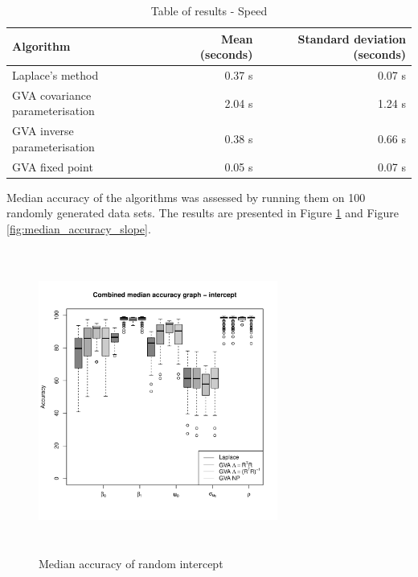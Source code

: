 			\begin{table}
				\caption{Table of results - Speed}
				\label{tab:application_slope_speed}
				\begin{tabular}{|l|rr|}
					\hline
					Algorithm                            & Mean (seconds) & Standard deviation (seconds) \\
					\hline
					Laplace's method                     & 0.37 s         & 0.07 s                       \\
					GVA covariance parameterisation        & 2.04 s         & 1.24 s                       \\
					GVA inverse parameterisation & 0.38 s         & 0.66 s                       \\
					GVA fixed point                            & 0.05 s         & 0.07 s                       \\
					\hline
				\end{tabular}
			\end{table}

					
			Median accuracy of the algorithms was assessed by running them on 100 randomly generated data sets. The	results are presented in Figure \ref{fig:median_accuracy_intercept} and Figure
			\ref{fig:median_accuracy_slope}.
					
			\begin{figure}
				\begin{center}
					\includegraphics[width=0.7\textwidth, height=100mm]{code/results/median_accuracy_combined_intercept.pdf}
					\caption{Median accuracy of random intercept}
					\label{fig:median_accuracy_intercept}
				\end{center}
			\end{figure}
					
